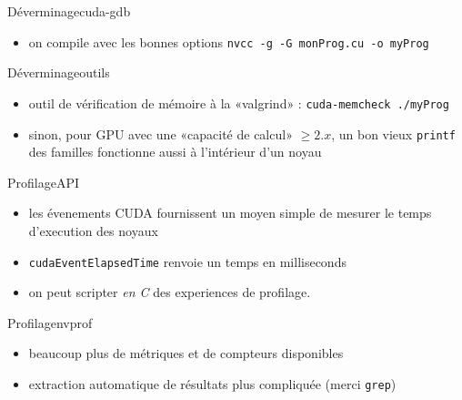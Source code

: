 \documentclass[11pt,mathserif]{beamer}
\newcommand{\scout}{\faAngellist}
\newcommand{\argi}{\faLightbulbO}
\newcommand{\kontuz}{\faExclamationTriangle}
\newcommand{\pozik}{\faSmileO}
\newcommand{\triste}{\faFrownO}
\newcommand{\harritu}{\faExclamation}
\begin{document}
\begin{frame}{Déverminage}{cuda-gdb}
  \begin{itemize}[<+->]
        \item on compile avec les bonnes options \texttt{nvcc -g -G monProg.cu -o myProg}
   \end{itemize}
\pause
  
\end{frame}

\begin{frame}{Déverminage}{outils}
  \begin{itemize}[<+->]
    \item outil de vérification de mémoire à la «valgrind» : \texttt{cuda-memcheck ./myProg}
    \item[\scout] sinon, pour GPU avec une «capacité de calcul» $\geqslant 2.x$, un bon vieux \texttt{printf} des familles fonctionne aussi
    à l'intérieur d'un noyau \harritu
  \end{itemize} 
\end{frame}

\begin{frame}{Profilage}{API}
  \begin{itemize}[<+->]
    \item[\argi] les évenements CUDA fournissent un moyen simple de mesurer le temps d'execution des noyaux
\begin{center}
  
\end{center}
   \item[\kontuz] \texttt{cudaEventElapsedTime} renvoie un temps en milliseconds
   \item[\pozik] on peut scripter {\em en C} des experiences de profilage.
  \end{itemize}
\end{frame}

\begin{frame}{Profilage}{nvprof}
  \begin{itemize}[<+->]
    \item[\pozik] beaucoup plus de métriques et de compteurs disponibles
    \item[\triste] extraction automatique de résultats plus compliquée (merci \texttt{grep})
  \end{itemize}
\pause
\end{frame}
\end{document}
